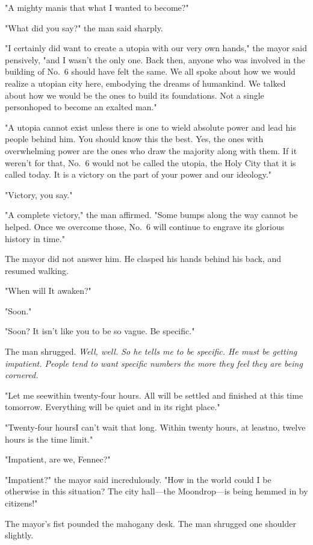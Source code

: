 "A mighty man\el is that what I wanted to become?"

"What did you say?" the man said sharply.

"I certainly did want to create a utopia with our very own hands," the
mayor said pensively, "and I wasn't the only one. Back then, anyone who
was involved in the building of No.~6 should have felt the same. We all
spoke about how we would realize a utopian city here, embodying the
dreams of humankind. We talked about how we would be the ones to build
its foundations. Not a single person\el hoped to become an exalted man."

"A utopia cannot exist unless there is one to wield absolute power and
lead his people behind him. You should know this the best. Yes, the ones
with overwhelming power are the ones who draw the majority along with
them. If it weren't for that, No.~6 would not be called the utopia, the
Holy City that it is called today. It is a victory on the part of your
power and our ideology."

"Victory, you say."

"A complete victory," the man affirmed. "Some bumps along the way cannot
be helped. Once we overcome those, No.~6 will continue to engrave its
glorious history in time."

The mayor did not answer him. He clasped his hands behind his back, and
resumed walking.

"When will It awaken?"

"Soon."

"Soon? It isn't like you to be so vague. Be specific."

The man shrugged. \emph{Well, well. So he tells me to be specific. He must be
getting impatient. People tend to want specific numbers the more they
feel they are being cornered.}

"Let me see\el within twenty-four hours. All will be settled and
finished at this time tomorrow. Everything will be quiet and in its
right place."

"Twenty-four hours\el I can't wait that long. Within twenty hours, at
least\el no, twelve hours is the time limit."

"Impatient, are we, Fennec?"

"Impatient?" the mayor said incredulously. "How in the world could I be
otherwise in this situation? The city hall---the Moondrop---is being hemmed
in by citizens!"

The mayor's fist pounded the mahogany desk. The man shrugged one
shoulder slightly.

